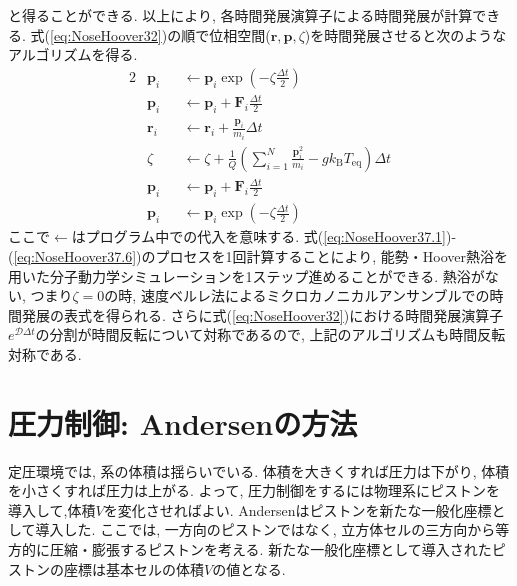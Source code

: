 と得ることができる.
以上により, 各時間発展演算子による時間発展が計算できる.
式(\ref{eq:NoseHoover32})の順で位相空間($\bm{r},\bm{p},\zeta$)を時間発展させると次のようなアルゴリズムを得る.
\begin{alignat}{2}
 &\bm{p}_{i} &&\gets \bm{p}_{i} \exp \left(-\zeta \frac{\Delta t}{2}\right)
 \label{eq:NoseHoover37.1}
 \\
 &\bm{p}_{i} &&\gets \bm{p}_{i} + \bm{F}_{i} \frac{\Delta t}{2}
 \label{eq:NoseHoover37.2}
 \\
 &\bm{r}_{i} &&\gets \bm{r}_{i} + \frac{\bm{p}_{i}}{m_{i}} \Delta t
 \label{eq:NoseHoover37.3}
 \\
 &\zeta          &&\gets \zeta
                           + \frac{1}{Q}
                           \left(
                           \sum_{i=1}^{N} \frac{\bm{p}_{i}^{2}}{m_{i}}
                           - g k_{\mathrm{B}} T_{\mathrm{eq}}
                           \right) \Delta t
 \label{eq:NoseHoover37.4}
 \\
 &\bm{p}_{i} &&\gets \bm{p}_{i} + \bm{F}_{i} \frac{\Delta t}{2}
 \label{eq:NoseHoover37.5}
 \\
 &\bm{p}_{i} &&\gets \bm{p}_{i} \exp \left(-\zeta \frac{\Delta t}{2}\right)
 \label{eq:NoseHoover37.6}
\end{alignat}
ここで$\gets$はプログラム中での代入を意味する.
式(\ref{eq:NoseHoover37.1})-(\ref{eq:NoseHoover37.6})のプロセスを1回計算することにより, 能勢・Hoover熱浴を用いた分子動力学シミュレーションを1ステップ進めることができる.
熱浴がない, つまり$\zeta=0$の時, 速度ベルレ法によるミクロカノニカルアンサンブルでの時間発展の表式を得られる.
さらに式(\ref{eq:NoseHoover32})における時間発展演算子$e^{\mathcal{D} \Delta t}$の分割が時間反転について対称であるので, 上記のアルゴリズムも時間反転対称である.

\clearpage

\section{圧力制御: Andersenの方法}
定圧環境では, 系の体積は揺らいでいる. 
体積を大きくすれば圧力は下がり, 体積を小さくすれば圧力は上がる. 
よって, 圧力制御をするには物理系にピストンを導入して,体積$V$を変化させればよい. 
Andersenはピストンを新たな一般化座標として導入した\cite{1980Andersen}. 
ここでは, 一方向のピストンではなく, 立方体セルの三方向から等方的に圧縮・膨張するピストンを考える. 
新たな一般化座標として導入されたピストンの座標は基本セルの体積$V$の値となる.

